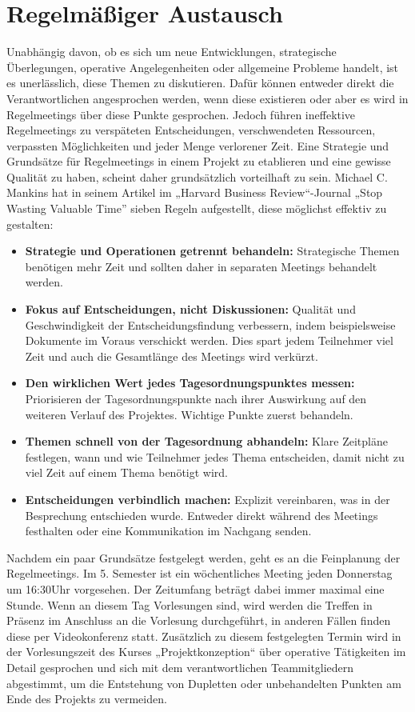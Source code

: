 \section{Regelmäßiger Austausch}
Unabhängig davon, ob es sich um neue Entwicklungen, strategische Überlegungen, operative Angelegenheiten oder allgemeine Probleme handelt,
ist es unerlässlich, diese Themen zu diskutieren. Dafür können entweder direkt die Verantwortlichen angesprochen werden, wenn diese
existieren oder aber es wird in Regelmeetings über diese Punkte gesprochen. Jedoch führen ineffektive Regelmeetings zu verspäteten Entscheidungen,
verschwendeten Ressourcen, verpassten Möglichkeiten und jeder Menge verlorener Zeit. 
Eine Strategie und Grundsätze für Regelmeetings in einem Projekt zu etablieren und eine gewisse Qualität zu haben,
scheint daher grundsätzlich vorteilhaft zu sein. Michael C. Mankins hat in seinem Artikel im „Harvard Business Review“-Journal „Stop Wasting Valuable Time” sieben Regeln
aufgestellt, diese möglichst effektiv zu gestalten:
\begin{itemize}
    \item \textbf{Strategie und Operationen getrennt behandeln:} Strategische Themen benötigen mehr Zeit und sollten daher in separaten Meetings behandelt werden.
    \item \textbf{Fokus auf Entscheidungen, nicht Diskussionen:} Qualität und Geschwindigkeit der Entscheidungsfindung verbessern, indem beispielsweise Dokumente im Voraus verschickt werden. Dies spart jedem Teilnehmer viel Zeit und auch die Gesamtlänge des Meetings wird verkürzt.
    \item \textbf{Den wirklichen Wert jedes Tagesordnungspunktes messen:} Priorisieren der Tagesordnungspunkte nach ihrer Auswirkung auf den weiteren Verlauf des Projektes. Wichtige Punkte zuerst behandeln.
    \item \textbf{Themen schnell von der Tagesordnung abhandeln:} Klare Zeitpläne festlegen, wann und wie Teilnehmer jedes Thema entscheiden, damit nicht zu viel Zeit auf einem Thema benötigt wird.
    \item \textbf{Entscheidungen verbindlich machen:} Explizit vereinbaren, was in der Besprechung entschieden wurde. Entweder direkt während des Meetings festhalten oder eine Kommunikation im Nachgang senden.
\end{itemize}
Nachdem ein paar Grundsätze festgelegt werden, geht es an die Feinplanung der 
Regelmeetings. Im 5. Semester ist ein wöchentliches Meeting jeden Donnerstag um 16:30Uhr vorgesehen.
Der Zeitumfang beträgt dabei immer maximal eine Stunde. Wenn an diesem Tag Vorlesungen sind, wird werden die Treffen in Präsenz
im Anschluss an die Vorlesung durchgeführt, in anderen Fällen finden diese per Videokonferenz statt. Zusätzlich zu diesem festgelegten Termin wird in der Vorlesungszeit
des Kurses „Projektkonzeption“ über operative Tätigkeiten im Detail gesprochen und sich mit dem verantwortlichen Teammitgliedern abgestimmt,
um die Entstehung von Dupletten oder unbehandelten Punkten am Ende des Projekts zu vermeiden.
